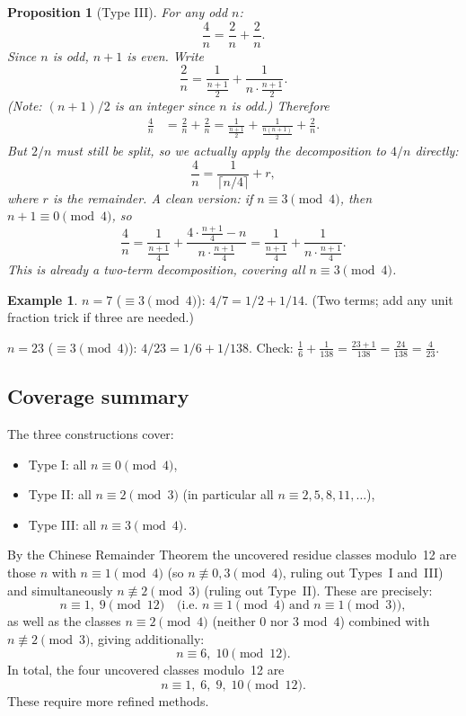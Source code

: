 \documentclass[12pt,a4paper]{amsart}
\newtheorem{proposition}[theorem]{Proposition}
\theoremstyle{definition}
\newtheorem{example}[theorem]{Example}
\begin{document}
\begin{proposition}[Type III]\label{prop:typeIII}
For any odd $n$:
\[
  \frac{4}{n} = \frac{2}{n} + \frac{2}{n}.
\]
Since $n$ is odd, $n+1$ is even.  Write
\[
  \frac{2}{n} = \frac{1}{\frac{n+1}{2}} + \frac{1}{n \cdot \frac{n+1}{2}}.
\]
(Note: $(n+1)/2$ is an integer since $n$ is odd.)  Therefore
\begin{align*}
  \frac{4}{n} &= \frac{2}{n} + \frac{2}{n}
   = \frac{1}{\frac{n+1}{2}} + \frac{1}{\frac{n(n+1)}{2}}
     + \frac{2}{n}.
\end{align*}
But $2/n$ must still be split, so we actually apply the decomposition to
$4/n$ directly:
\[
  \frac{4}{n} = \frac{1}{\lceil n/4 \rceil} + r,
\]
where $r$ is the remainder.  A clean version: if $n \equiv 3 \pmod 4$, then
$n+1 \equiv 0 \pmod 4$, so
\[
  \frac{4}{n} = \frac{1}{\frac{n+1}{4}} + \frac{4 \cdot \frac{n+1}{4} - n}{n \cdot \frac{n+1}{4}}
             = \frac{1}{\frac{n+1}{4}} + \frac{1}{n \cdot \frac{n+1}{4}}.
\]
This is already a two-term decomposition, covering all $n \equiv 3 \pmod 4$.
\end{proposition}

\begin{example}
$n = 7$ ($\equiv 3 \pmod 4$): $4/7 = 1/2 + 1/14$. (Two terms; add any unit fraction trick if three are needed.) \checkmark

$n = 23$ ($\equiv 3 \pmod 4$): $4/23 = 1/6 + 1/138$.
Check: $\frac{1}{6} + \frac{1}{138} = \frac{23 + 1}{138} = \frac{24}{138} = \frac{4}{23}$. \checkmark
\end{example}

\subsection{Coverage summary}

The three constructions cover:
\begin{itemize}
  \item Type I: all $n \equiv 0 \pmod 4$,
  \item Type II: all $n \equiv 2 \pmod 3$ (in particular all $n \equiv 2, 5, 8, 11, \ldots$),
  \item Type III: all $n \equiv 3 \pmod 4$.
\end{itemize}
By the Chinese Remainder Theorem the uncovered residue classes modulo~12 are
those $n$ with $n \equiv 1 \pmod{4}$ (so $n \not\equiv 0,3 \pmod 4$,
ruling out Types~I and~III) and simultaneously $n \not\equiv 2 \pmod{3}$
(ruling out Type~II).  These are precisely:
\[
  n \equiv 1,\; 9 \pmod{12}
  \quad\text{(i.e.\ }n \equiv 1 \pmod 4\text{ and }n \equiv 1 \pmod 3\text{)},
\]
as well as the classes $n \equiv 2 \pmod 4$ (neither $0$ nor $3$ mod~$4$)
combined with $n \not\equiv 2 \pmod 3$, giving additionally:
\[
  n \equiv 6,\; 10 \pmod{12}.
\]
In total, the four uncovered classes modulo~12 are
\[
  n \equiv 1,\; 6,\; 9,\; 10 \pmod{12}.
\]
These require more refined methods.
\end{document}
